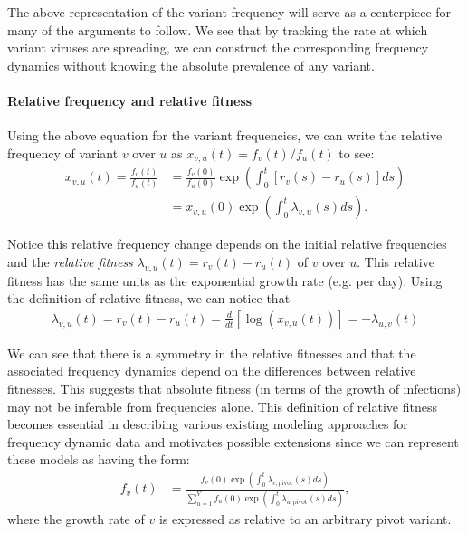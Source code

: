 \documentclass[12pt,oneside,letterpaper]{article}
\begin{document}
The above representation of the variant frequency will serve as a centerpiece for many of the arguments to follow.
We see that by tracking the rate at which variant viruses are spreading, we can construct the corresponding frequency dynamics without knowing the absolute prevalence of any variant.

\paragraph{Relative frequency and relative fitness}%

Using the above equation for the variant frequencies, we can write the relative frequency of variant $v$ over $u$ as $x_{v,u}(t) = f_{v}(t) / f_{u}(t)$ to see:
\begin{align*}
    x_{v, u}(t) = \frac{f_{v}(t)}{f_{u}(t)} &= \frac{f_{v}(0)}{f_{u}(0)} \exp \left( \int_{0}^{t} [r_{v}(s) - r_{u}(s)] ds \right)\\
                                            &=x_{v,u}(0)\exp \left( \int_{0}^{t} \lambda_{v,u}(s) ds \right).
\end{align*}

Notice this relative frequency change depends on the initial relative frequencies and the \emph{relative fitness} $\lambda_{v,u}(t) = r_{v}(t) - r_{u}(t)$ of $v$ over $u$.
This relative fitness has the same units as the exponential growth rate (e.g. per day). 
Using the definition of relative fitness, we can notice that
\begin{align}
\lambda_{v, u}(t) = r_{v}(t) - r_{u}(t) = \frac{d }{d t} \left[\log \left( x_{v,u}(t) \right) \right] = - \lambda_{u,v}(t)
\end{align}

We can see that there is a symmetry in the relative fitnesses and that the associated frequency dynamics depend on the differences between relative fitnesses.
This suggests that absolute fitness (in terms of the growth of infections) may not be inferable from frequencies alone.
This definition of relative fitness becomes essential in describing various existing modeling approaches for frequency dynamic data and motivates possible extensions since we can represent these models as having the form:
\begin{align}
    f_{v}(t) &= \frac{ f_{v}(0) \exp( \int_{0}^{t} \lambda_{v, \text{pivot}}(s) ds)}{\sum_{u=1}^{V}  f_{u}(0) \exp( \int_{0}^{t} \lambda_{u, \text{pivot}}(s) ds)},
\end{align}
where the growth rate of $v$ is expressed as relative to an arbitrary pivot variant.
\end{document}
